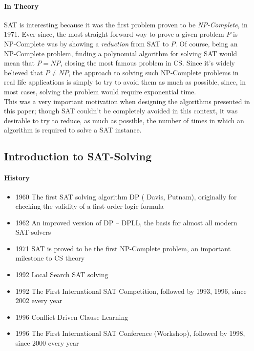 \documentclass[]{article}
\begin{document}
	\paragraph{In Theory} SAT is interesting because it was the first problem proven to be \textit{NP-Complete}, in 1971. Ever since, the most straight forward way to prove a given problem $ P $ is NP-Complete was by showing a \textit{reduction} from SAT to $ P $. Of course, being an NP-Complete problem, finding a polynomial algorithm for solving SAT would mean that $ P=NP $, closing the most famous problem in CS. Since it's widely believed that $ P \neq NP $, the approach to solving such NP-Complete problems in real life applications is simply to try to avoid them as much as possible, since, in most cases, solving the problem would require exponential time. \\
	This was a very important motivation when designing the algorithms presented in this paper; though SAT couldn't be completely avoided in this context, it was desirable to try to reduce, as much as possible, the number of times in which an algorithm is required to solve a SAT instance.
	\pagebreak
	\subsection{Introduction to SAT-Solving}
	\paragraph{History}
	\begin{itemize}
		\item 1960 The first SAT solving algorithm DP ( Davis, Putnam), originally for checking the validity of a first-order logic formula
		\item 1962 An improved version of DP – DPLL, the basis for almost all modern SAT-solvers
		\item 1971 SAT is proved to be the first NP-Complete problem, an important milestone to CS theory
		\item 1992 Local Search SAT solving
		\item 1992 The First International SAT Competition, followed by 1993, 1996, since 2002 every year
		\item 1996 Conflict Driven Clause Learning
		\item 1996 The First International SAT Conference (Workshop), followed by 1998, since 2000 every year
	\end{itemize}
	
\end{document}
